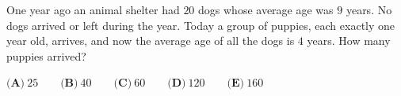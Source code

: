 One year ago an animal shelter had $20$ dogs whose average age was $9$ years. No dogs arrived or left during the year. Today a group of puppies, each exactly one year old, arrives, and now the average age of all the dogs is $4$ years. How many puppies arrived?

$\textbf{(A)}\ 25\qquad\textbf{(B)}\ 40\qquad\textbf{(C)}\ 60\qquad\textbf{(D)}\ 120\qquad\textbf{(E)}\ 160$
